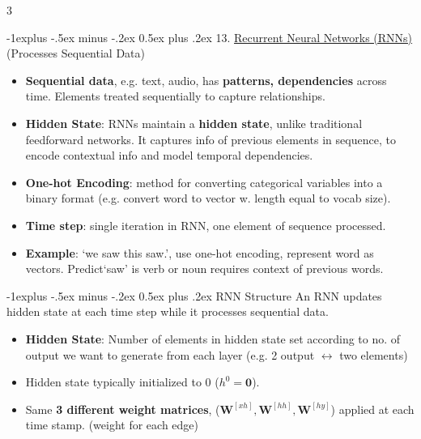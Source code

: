 \documentclass[a4paper, 9pt, landscape]{article}
\makeatletter
\renewcommand{\subsection}{\@startsection{subsection}{2}{0mm}%
                                {-1explus -.5ex minus -.2ex}%
                                {0.5ex plus .2ex}%
                                {\normalfont\normalsize\bfseries}}
\makeatother
\begin{document}
\begin{multicols*}{3}
\columnbreak

\subsection{13. \underline{Recurrent Neural Networks (RNNs)} {\scriptsize (Processes Sequential Data)}}
\begin{itemize}
\item \textbf{Sequential data}, e.g. text, audio, has \textbf{patterns, dependencies} across time. Elements treated sequentially to capture relationships.
\item \textbf{Hidden State}: RNNs maintain a \textbf{hidden state}, unlike traditional feedforward networks. It captures info of previous elements in sequence, to encode contextual info and model temporal dependencies.
\item \textbf{One-hot Encoding}: method for converting categorical variables into a binary format (e.g. convert word to vector w. length equal to vocab size).
\item \textbf{Time step}:  single iteration in RNN, one element of sequence processed.
\item \textbf{Example}: `we saw this saw.', use one-hot encoding, represent word as vectors. Predict`saw' is verb or noun requires context of previous words.
\end{itemize}

\subsection{RNN Structure}
An RNN updates hidden state at each time step while it processes sequential data.
\begin{itemize}
\item \textbf{Hidden State}: Number of elements in hidden state set according to no. of output we want to generate from each layer (e.g. 2 output $\leftrightarrow$ two elements)
\item Hidden state typically initialized to 0 ($h^0 = \mathbf{0}$).
\item Same \textbf{3 different weight matrices}, ($\mathbf{W}^{[xh]}, \mathbf{W}^{[hh]}, \mathbf{W}^{[hy]}$) applied at each time stamp. (weight for each edge)
\end{itemize}



\end{multicols*}
\end{document}
